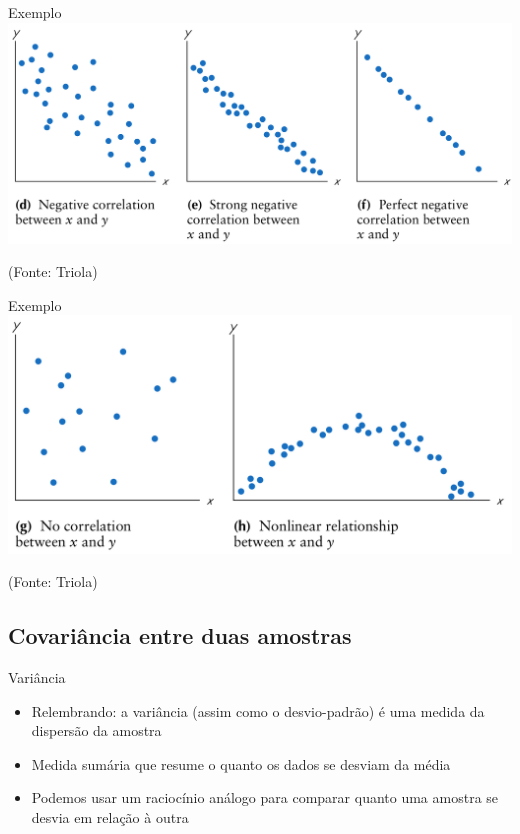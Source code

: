 \documentclass{beamer}
\begin{document}
\begin{frame}{Exemplo}
  \includegraphics[height=0.6\textheight]{Assoc/negative}

  (Fonte: Triola)
\end{frame}

\begin{frame}{Exemplo}
  \includegraphics[height=0.6\textheight]{Assoc/other}

  (Fonte: Triola)
\end{frame}

\subsection[Covariância]{Covariância entre duas amostras}

\begin{frame}{Variância}
  \begin{itemize}
  \item Relembrando: a variância (assim como o desvio-padrão) é uma
    medida da dispersão da amostra
  \item Medida sumária que resume o quanto os dados se desviam da
    média
  \item Podemos usar um raciocínio análogo para comparar quanto uma
    amostra se desvia em relação à outra
  \end{itemize}
\end{frame}
\end{document}
